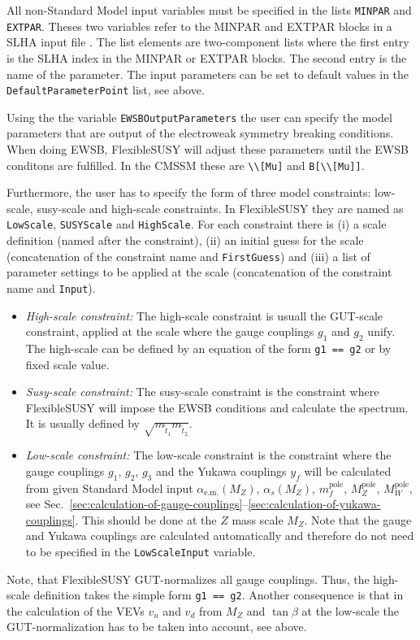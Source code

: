 \documentclass[final,3p,times,pdflatex]{elsarticle}
\newcommand{\fs}{FlexibleSUSY\xspace}
\newcommand{\code}[1]{\lstinline|#1|}  %
\newcommand{\pole}{\text{pole}}
\begin{document}
All non-Standard Model input variables must be specified in the lists
\code{MINPAR} and \code{EXTPAR}.  Theses two variables refer to the
MINPAR and EXTPAR blocks in a SLHA input file \cite{Skands:2003cj}.
The list elements are two-component lists where the first entry is the
SLHA index in the MINPAR or EXTPAR blocks.  The second entry is the
name of the parameter.  The input parameters can be set to default
values in the \code{DefaultParameterPoint} list, see above.

Using the the variable \code{EWSBOutputParameters} the user can
specify the model parameters that are output of the electroweak
symmetry breaking conditions.  When doing EWSB, \fs will adjust these
parameters until the EWSB conditons are fulfilled.  In the CMSSM these
are \code{\\[Mu]} and \code{B[\\[Mu]]}.

Furthermore, the user has to specify the form of three model
constraints: low-scale, susy-scale and high-scale constraints.  In \fs
they are named as \code{LowScale}, \code{SUSYScale} and
\code{HighScale}.  For each constraint there is (i) a scale definition
(named after the constraint), (ii) an initial guess for the scale
(concatenation of the constraint name and \code{FirstGuess}) and (iii)
a list of parameter settings to be applied at the scale (concatenation
of the constraint name and \code{Input}).
%
\begin{itemize}
\item \emph{High-scale constraint:} The high-scale constraint is
  usuall the GUT-scale constraint, applied at the scale where the
  gauge couplings $g_1$ and $g_2$ unify.  The high-scale can be
  defined by an equation of the form \code{g1 == g2} or by fixed scale
  value.
\item \emph{Susy-scale constraint:} The susy-scale constraint is the
  constraint where \fs will impose the EWSB conditions and calculate
  the spectrum.  It is usually defined by
  $\sqrt{m_{\tilde{t}_1}m_{\tilde{t}_2}}$.
\item \emph{Low-scale constraint:} The low-scale constraint is the
  constraint where the gauge couplings $g_1$, $g_2$, $g_3$ and the
  Yukawa couplings $y_f$ will be calculated from given Standard Model
  input $\alpha_{\text{e.m.}}(M_Z)$, $\alpha_{s}(M_Z)$, $m_f^\pole$,
  $M_Z^\pole$, $M_W^\pole$, see
  Sec.~\ref{sec:calculation-of-gauge-couplings}--\ref{sec:calculation-of-yukawa-couplings}.
  This should be done at the $Z$ mass scale $M_Z$.  Note that the
  gauge and Yukawa couplings are calculated automatically and
  therefore do not need to be specified in the \code{LowScaleInput}
  variable.
\end{itemize}
%
Note, that \fs GUT-normalizes all gauge couplings.  Thus, the
high-scale definition takes the simple form \code{g1 == g2}.  Another
consequence is that in the calculation of the VEVs $v_u$ and $v_d$
from $M_Z$ and $\tan\beta$ at the low-scale the GUT-normalization has
to be taken into account, see above.
\end{document}
